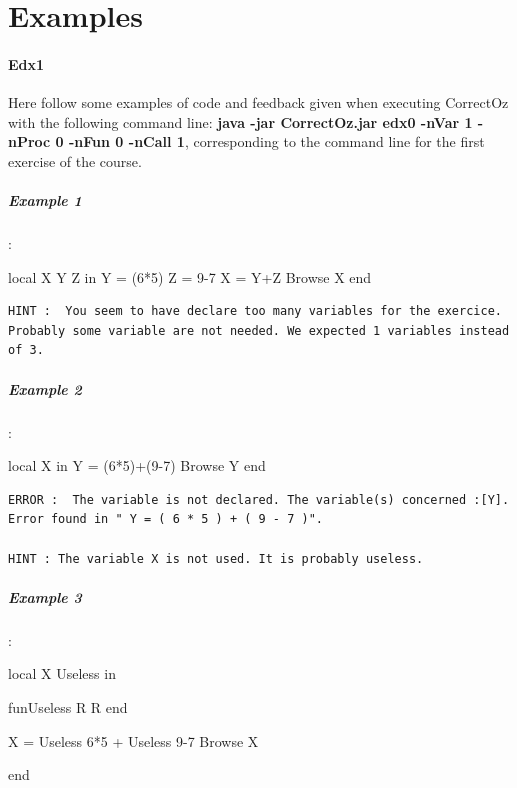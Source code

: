 \documentclass[11pt,a4paper,twoside,openright]{report}
\begin{document}
\chapter{Examples}
\label{app:ex}
\subsubsection{Edx1}
Here follow some examples of code and feedback given when executing CorrectOz 
 with the following command line: \textbf{java -jar CorrectOz.jar edx0 
-nVar 1 -nProc 0 -nFun 0 -nCall 1}, corresponding to the command line for the 
first exercise of the course.

\paragraph{Example 1}:
\begin{OZ}
local X Y Z in 
	Y = (6*5)
	Z = 9-7
	X = Y+Z
	{Browse X}
end
\end{OZ}

\begin{lstlisting}
HINT :  You seem to have declare too many variables for the exercice. 
Probably some variable are not needed. We expected 1 variables instead of 3.

\end{lstlisting}

\paragraph{Example 2}:

\begin{OZ}
local X in 
	Y = (6*5)+(9-7)
	{Browse Y}
end
\end{OZ}

\begin{lstlisting}
ERROR :  The variable is not declared. The variable(s) concerned :[Y]. 
Error found in " Y = ( 6 * 5 ) + ( 9 - 7 )".

HINT : The variable X is not used. It is probably useless.

\end{lstlisting}

\paragraph{Example 3}:

\begin{OZ}
local X Useless in 
	
	fun{Useless R}
		R
	end

	X = {Useless 6*5} + {Useless 9-7}
	{Browse X}

end
\end{OZ}
\end{document}
